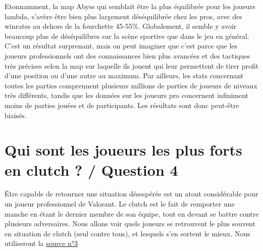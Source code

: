 \documentclass[
]{article}
\begin{document}
Etonnamment, la map Abyss qui semblait être la plus équilibrée pour les
joueurs lambda, s'avère être bien plus largement déséquilibrée chez les
pros, avec des winrates au dehors de la fourchette 45-55\%. Globalement,
il semble y avoir beaucoup plus de déséquilibres sur la scène sportive
que dans le jeu en général. C'est un résultat surprenant, mais on peut
imaginer que c'est parce que les joueurs professionnels ont des
connaissances bien plus avancées et des tactiques très précises selon la
map sur laquelle ils jouent qui leur permettent de tirer profit d'une
position ou d'une autre au maximum. Par ailleurs, les stats concernant
toutes les parties comprennent plusieurs millions de parties de joueurs
de niveaux très différents, tandis que les données sur les joueurs pro
concernent infiniment moins de parties jouées et de participants. Les
résultats sont donc peut-être biaisés.

\section{Qui sont les joueurs les plus forts en clutch ? / Question
4}\label{qui-sont-les-joueurs-les-plus-forts-en-clutch-question-4}

Être capable de retourner une situation désespérée est un atout
considérable pour un joueur professionnel de Valorant. Le clutch est le
fait de remporter une manche en étant le dernier membre de son équipe,
tout en devant se battre contre plusieurs adversaires. Nous allons voir
quels joueurs se retrouvent le plus souvent en situation de clutch (seul
contre tous), et lesquels s'en sortent le mieux. Nous utiliseront la
\href{https://www.kaggle.com/datasets/ryanluong1/valorant-champion-tour-2021-2023-data}{source
n°3}
\end{document}

